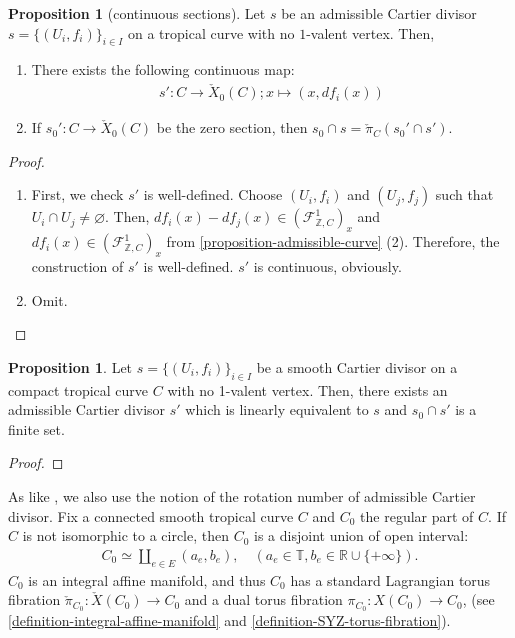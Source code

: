 \documentclass[a4paper,dvipdfmx,reqno,12pt]{amsart}
\theoremstyle{definition}
\newtheorem{proposition}[theorem]{Proposition}
\newcommand{\emp}{\varnothing}%
\numberwithin{equation}{section}
\begin{document}
\begin{proposition}[{continuous sections}]
\label{proposition-admissible-section}
Let $s$ be an admissible Cartier divisor 
$s=\{(U_i,f_i)\}_{i\in I}$ on a tropical curve with 
no $1$-valent vertex. 
Then, 
\begin{enumerate}
\item There exists the following continuous map:
\begin{align}
s'\colon C\to \check{X}_0 (C); x\mapsto (x,df_{i}(x))
\end{align}
\item If $s_0'\colon C\to \check{X}_0 (C)$ be the 
zero section, then $s_0\cap s=\check{\pi}_C(s_0'\cap s')$.
\end{enumerate}
\end{proposition}
\begin{proof}
\begin{enumerate}
\item First, we check $s'$ is well-defined.
Choose $(U_i,f_i)$ and $(U_j,f_j)$ such that
$U_i\cap U_j\neq \emp$. 
Then, $df_i(x)-df_j(x)\in 
(\mathcal{F}_{\mathbb{Z},C}^{1})_x$ and
$df_i(x)\in (\mathcal{F}_{\mathbb{Z},C}^{1})_x$
from \cref{proposition-admissible-curve} (2).
Therefore, the construction of $s'$ is well-defined.
$s'$ is continuous, obviously.
\item Omit.
\end{enumerate}
\end{proof}

\begin{proposition}
Let $s=\{(U_i,f_i)\}_{i\in I}$ be a smooth Cartier divisor on a compact
tropical curve $C$ with no 1-valent vertex.
Then, there exists
an admissible Cartier divisor $s'$ which is linearly
equivalent to $s$ and
$s_0\cap s'$ is a finite set. 
\end{proposition}

\begin{proof}

\end{proof}

As like \cite{auroux2022lagrangian},
we also use the notion of the rotation number of 
admissible Cartier divisor.
Fix a connected smooth tropical curve $C$
 and $C_0$ the 
regular part of $C$.
If $C$ is not isomorphic to a circle, then
$C_0$ is a disjoint union of open interval:
\begin{align}
  C_0\simeq \coprod_{e\in E} (a_e,b_e), \quad
(a_e\in \mathbb{T}, b_e\in \mathbb{R}\cup\{+\infty\}).
\end{align}
$C_0$ is an integral affine manifold, 
and thus $C_0$ has a standard Lagrangian torus fibration
$\check{\pi}_{C_0}\colon \check{X}(C_0)\to C_0$ and
a dual torus fibration 
$\pi_{C_0}\colon X(C_0)\to C_0$,
(see \cref{definition-integral-affine-manifold}
and \cref{definition-SYZ-torus-fibration}).
\end{document}
